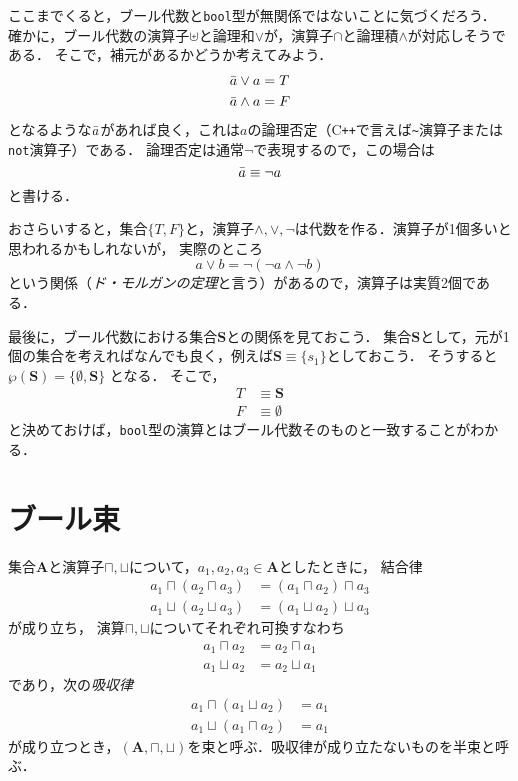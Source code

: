 \documentclass{jsbook}
\newcommand{\cxx}{\textrm{C}\texttt{++}}
\newcommand{\ccode}[1]{\texttt{#1}}
\newcommand{\keyword}[1]{\emph{#1}}
\newcommand{\bg}[1]{\mathbf{#1}}
\begin{document}
ここまでくると，ブール代数と\ccode{bool}型が無関係ではないことに気づくだろう．
確かに，ブール代数の演算子$\uplus$と論理和$\vee$が，演算子$\cap$と論理積$\wedge$が対応しそうである．
そこで，補元があるかどうか考えてみよう．
\begin{align}
\Bar{a}\vee a&=T\\
\Bar{a}\wedge a&=F
\end{align}
となるような$\Bar{a}$があれば良く，これは$a$の論理否定（\cxx で言えば\verb|~|演算子または\ccode{not}演算子）である．
論理否定は通常$\neg$で表現するので，この場合は
\begin{equation}
\Bar{a}\equiv\neg a
\end{equation}
と書ける．

おさらいすると，集合$\{T,F\}$と，演算子$\wedge,\vee,\neg$は代数を作る．演算子が1個多いと思われるかもしれないが，
実際のところ
\begin{equation}
a\vee b=\neg(\neg a\wedge\neg b)
\end{equation}
という関係（\keyword{ド・モルガンの定理}と言う）があるので，演算子は実質2個である．

最後に，ブール代数における集合$\bg{S}$との関係を見ておこう．
集合$\bg{S}$として，元が1個の集合を考えればなんでも良く，例えば$\bg{S}\equiv\{s_1\}$としておこう．
そうすると $\wp(\bg{S})=\{\emptyset,\bg{S}\}$ となる．
そこで，
\begin{align}
T&\equiv\bg{S}\\
F&\equiv\emptyset
\end{align}
と決めておけば，\ccode{bool}型の演算とはブール代数そのものと一致することがわかる．

\section{ブール束}

集合$\bg{A}$と演算子$\sqcap,\sqcup$について，$a_1,a_2,a_3\in\bg{A}$としたときに，
結合律
\begin{align}
a_1\sqcap(a_2\sqcap a_3)&=(a_1\sqcap a_2)\sqcap a_3\\
a_1\sqcup(a_2\sqcup a_3)&=(a_1\sqcup a_2)\sqcup a_3
\end{align}
が成り立ち，
演算$\sqcap,\sqcup$についてそれぞれ可換すなわち
\begin{align}
a_1\sqcap a_2&=a_2\sqcap a_1\\
a_1\sqcup a_2&=a_2\sqcup a_1
\end{align}
であり，次の\keyword{吸収律}
\begin{align}
a_1\sqcap(a_1\sqcup a_2)&=a_1\\
a_1\sqcup(a_1\sqcap a_2)&=a_1
\end{align}
が成り立つとき，$(\bg{A},\sqcap,\sqcup)$を束と呼ぶ．吸収律が成り立たないものを半束と呼ぶ．
\end{document}
